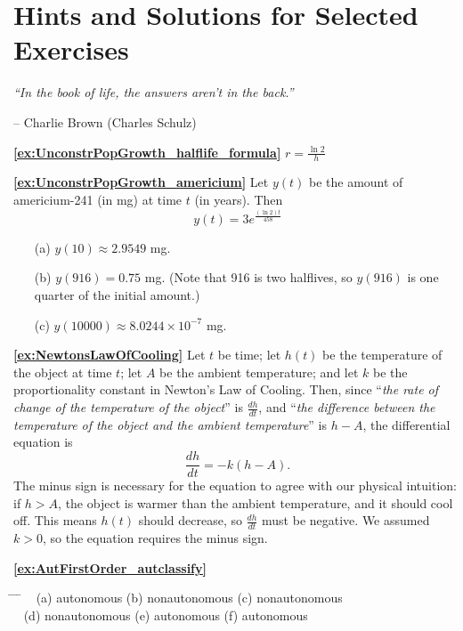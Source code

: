 \documentclass[reqno]{immbook}
\newcommand{\ds}{\displaystyle}
\numberwithin{equation}{chapter}
\numberwithin{question}{section}
\numberwithin{theorem}{chapter}
\numberwithin{figure}{chapter}
\theoremstyle{definition}
\begin{document}
\chapter[Hints and Solutions]{Hints and Solutions for Selected Exercises}

\noindent
\emph{``In the book of life, the answers aren't in the back.''}

\hfill        -- Charlie Brown (Charles Schulz)

\bigskip
\textbf{\ref{ex:UnconstrPopGrowth_halflife_formula}} $\ds r = \frac{\ln 2}{h}$

\medskip
\textbf{\ref{ex:UnconstrPopGrowth_americium}}
Let $y(t)$ be the amount of americium-241
(in mg) at time $t$ (in years). Then
\[
   y(t) = 3e^{\frac{(\ln 2)t}{458}}
\]
\begin{enumerate}
\item[(a)] $y(10) \approx 2.9549$ mg.
\item[(b)] $y(916) = 0.75$ mg. (Note that 916 is two halflives, so $y(916)$
is one quarter of the initial amount.)
\item[(c)] $y(10000) \approx 8.0244\times 10^{-7}$ mg.
\end{enumerate}

\medskip
\textbf{\ref{ex:NewtonsLawOfCooling}}
Let $t$ be time;
let $h(t)$ be the temperature of the object
at time $t$;
let $A$ be the ambient temperature;
and let $k$ be the proportionality constant in
Newton's Law of Cooling.
Then, since ``\emph{the rate of change of the temperature of the
object}'' is $\frac{dh}{dt}$, and ``\emph{the difference
between the temperature of the object and the ambient
temperature}'' is $h-A$, the differential equation is
\[
   \frac{dh}{dt} = - k (h-A).
\]
The minus sign is necessary for the equation to agree with
our physical intuition: if $h>A$, the object is warmer than the ambient
temperature, and it should cool off. This means $h(t)$ should
decrease, so $\frac{dh}{dt}$ must be negative.  We assumed
$k>0$, so the equation requires the minus sign.


\medskip
\textbf{\ref{ex:AutFirstOrder_autclassify}}
\begin{tabbing}
\hspace*{0.25in} \= \hspace*{1.5in} \= \hspace*{1.5in} \= \kill
~ \> 
(a) autonomous \>
(b) nonautonomous \>
(c) nonautonomous \\[2pt]
~ \>
(d) nonautonomous \>
(e) autonomous \>
(f) autonomous
\end{tabbing}
\end{document}
